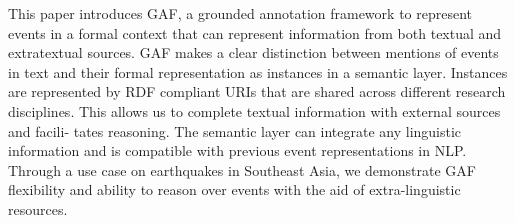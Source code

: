 This paper introduces GAF, a grounded annotation framework to represent events in a formal context that can represent information from both textual and
 extratextual sources. GAF makes a clear distinction between mentions of events
 in text and their formal representation as instances in a semantic layer.
 Instances are represented by RDF compliant URIs that are shared across
 different research disciplines. This allows us to complete textual information
 with external sources and facili- tates reasoning. The semantic layer can
 integrate any linguistic information and is compatible with previous event
 representations in NLP. Through a use case on earthquakes in Southeast Asia, we
 demonstrate GAF flexibility and ability to reason over events with the aid of
 extra-linguistic resources.

